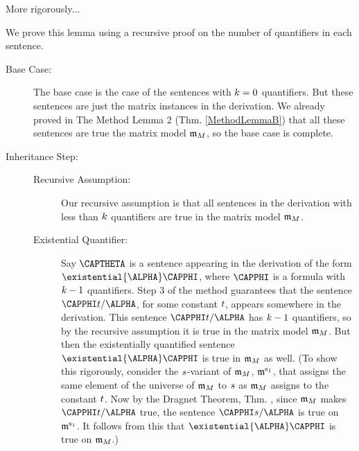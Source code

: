 More rigorously...

\begin{PROOF}
We prove this lemma using a recursive proof on the number of quantifiers in each sentence.
\begin{description}
\item[Base Case:] 
The base case is the case of the sentences with $k=0$ quantifiers. 
But these sentences are just the matrix instances in the derivation. 
We already proved in The Method Lemma 2 (Thm. \ref{MethodLemmaB}) that all these sentences are true the matrix model $\mathfrak{m}_M$, so the base case is complete.

\item[Inheritance Step:] \hfill
\begin{description}
\item[Recursive Assumption:]
Our recursive assumption is that all sentences in the derivation with less than $k$ quantifiers are true in the matrix model $\mathfrak{m}_M$.

\item[Existential Quantifier:]
Say $\CAPTHETA$ is a sentence appearing in the derivation of the form $\existential{\ALPHA}\CAPPHI$, where $\CAPPHI$ is a formula with $k-1$ quantifiers. 
Step 3 of the method guarantees that the sentence $\CAPPHI\variable{t}/\ALPHA$, for some constant $t$, appears somewhere in the derivation. 
This sentence $\CAPPHI\variable{t}/\ALPHA$ has $k-1$ quantifiers, so by the recursive assumption it is true in the matrix model $\mathfrak{m}_M$. 
But then the existentially quantified sentence $\existential{\ALPHA}\CAPPHI$ is true in $\mathfrak{m}_M$ as well.
(To show this rigorously, consider the $s$-variant of $\mathfrak{m}_M$, $\mathfrak{m^{\mathrm{s_1}}_{\mathrm{}}}$, that assigns the same element of the universe of $\mathfrak{m}_M$ to $s$ as $\mathfrak{m}_M$ assigns to the constant $t$.
Now by the Dragnet Theorem, Thm. , since $\mathfrak{m}_M$ makes $\CAPPHI\variable{t}/\ALPHA$ true, the sentence $\CAPPHI\variable{s}/\ALPHA$ is true on $\mathfrak{m^{\mathrm{s_1}}_{\mathrm{}}}$.
It follows from this that $\existential{\ALPHA}\CAPPHI$ is true on $\mathfrak{m}_M$.)


\end{description}
\end{description}
\end{PROOF}
